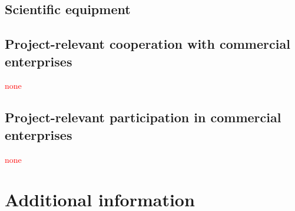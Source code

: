 \documentclass[a4paper,11pt,numbers=noenddot,parskip=half-]{scrreprt}
\begin{document}
\subsection{Scientific equipment}\label{sec:sci_equip}
\myblindtext


\subsection{Project-relevant cooperation with commercial enterprises}
\textcolor{red}{none}


\subsection{Project-relevant participation in commercial enterprises}
\textcolor{red}{none}

\section{Additional information}
\myblindtext
\end{document}
